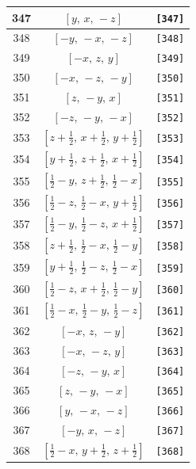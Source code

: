 \documentclass[fleqn,8pt]{jsarticle}
\begin{document}
\begin{longtable}{ccc}
347 & $\left[ y,\, x,\, - z \right]$ & {\tt [347]} \\ \hline
348 & $\left[ - y,\, - x,\, - z \right]$ & {\tt [348]} \\ \hline
349 & $\left[ - x,\, z,\, y \right]$ & {\tt [349]} \\ \hline
350 & $\left[ - x,\, - z,\, - y \right]$ & {\tt [350]} \\ \hline
351 & $\left[ z,\, - y,\, x \right]$ & {\tt [351]} \\ \hline
352 & $\left[ - z,\, - y,\, - x \right]$ & {\tt [352]} \\ \hline
353 & $\left[ z + \frac{1}{2},\, x + \frac{1}{2},\, y + \frac{1}{2} \right]$ & {\tt [353]} \\ \hline
354 & $\left[ y + \frac{1}{2},\, z + \frac{1}{2},\, x + \frac{1}{2} \right]$ & {\tt [354]} \\ \hline
355 & $\left[ \frac{1}{2} - y,\, z + \frac{1}{2},\, \frac{1}{2} - x \right]$ & {\tt [355]} \\ \hline
356 & $\left[ \frac{1}{2} - z,\, \frac{1}{2} - x,\, y + \frac{1}{2} \right]$ & {\tt [356]} \\ \hline
357 & $\left[ \frac{1}{2} - y,\, \frac{1}{2} - z,\, x + \frac{1}{2} \right]$ & {\tt [357]} \\ \hline
358 & $\left[ z + \frac{1}{2},\, \frac{1}{2} - x,\, \frac{1}{2} - y \right]$ & {\tt [358]} \\ \hline
359 & $\left[ y + \frac{1}{2},\, \frac{1}{2} - z,\, \frac{1}{2} - x \right]$ & {\tt [359]} \\ \hline
360 & $\left[ \frac{1}{2} - z,\, x + \frac{1}{2},\, \frac{1}{2} - y \right]$ & {\tt [360]} \\ \hline
361 & $\left[ \frac{1}{2} - x,\, \frac{1}{2} - y,\, \frac{1}{2} - z \right]$ & {\tt [361]} \\ \hline
362 & $\left[ - x,\, z,\, - y \right]$ & {\tt [362]} \\ \hline
363 & $\left[ - x,\, - z,\, y \right]$ & {\tt [363]} \\ \hline
364 & $\left[ - z,\, - y,\, x \right]$ & {\tt [364]} \\ \hline
365 & $\left[ z,\, - y,\, - x \right]$ & {\tt [365]} \\ \hline
366 & $\left[ y,\, - x,\, - z \right]$ & {\tt [366]} \\ \hline
367 & $\left[ - y,\, x,\, - z \right]$ & {\tt [367]} \\ \hline
368 & $\left[ \frac{1}{2} - x,\, y + \frac{1}{2},\, z + \frac{1}{2} \right]$ & {\tt [368]} \\ \hline

\end{longtable}
\end{document}

